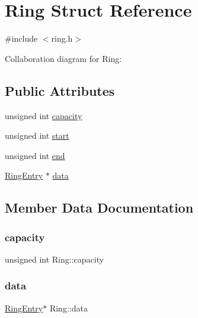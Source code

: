 \hypertarget{structRing}{}\section{Ring Struct Reference}
\label{structRing}


{\ttfamily \#include $<$ring.\+h$>$}



Collaboration diagram for Ring\+:
\subsection*{Public Attributes}
\begin{DoxyCompactItemize}
\item 
unsigned int \hyperlink{structRing_a49514c27dd8d8c6f850ac6cf86c3f8fc}{capacity}
\item 
unsigned int \hyperlink{structRing_a05ded3e84726b36d0b2266e733ddc61e}{start}
\item 
unsigned int \hyperlink{structRing_a704c118e618f3fac90554954b90ff363}{end}
\item 
\hyperlink{structRingEntry}{Ring\+Entry} $\ast$ \hyperlink{structRing_a610017b8cf1bff81f61e32bbf3cdf972}{data}
\end{DoxyCompactItemize}


\subsection{Member Data Documentation}
\mbox{\label{structRing_a49514c27dd8d8c6f850ac6cf86c3f8fc}} 
\subsubsection{\texorpdfstring{capacity}{capacity}}
{\footnotesize\ttfamily unsigned int Ring\+::capacity}

\mbox{\label{structRing_a610017b8cf1bff81f61e32bbf3cdf972}} 
\subsubsection{\texorpdfstring{data}{data}}
{\footnotesize\ttfamily \hyperlink{structRingEntry}{Ring\+Entry}$\ast$ Ring\+::data}

\mbox{\label{structRing_a704c118e618f3fac90554954b90ff363}} 

